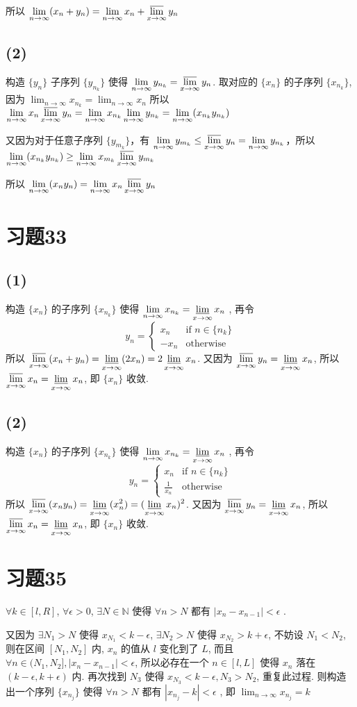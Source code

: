 \documentclass[a4paper,11pt]{article}
\newcommand{\Limit}{\displaystyle \lim_{n \rightarrow \infty}}
\newcommand{\uLimit}{\displaystyle \varlimsup_{x\rightarrow\infty}}
\newcommand{\dLimit}{\displaystyle \varliminf_{x\rightarrow\infty}}
\begin{document}
所以 $\Limit (x_n + y_n) = \Limit x_n + \uLimit y_n$
\subsection*{(2)}
构造 $\{y_n\}$ 子序列 $\{y_{n_k}\}$ 使得 $\Limit y_{n_k} = \uLimit y_n$. 取对应的 $\{x_n\}$ 的子序列 $\{x_{n_k}\}$, 因为 $\Limit x_{n_k} = \Limit x_n$ 所以$\Limit x_n\uLimit y_n = \Limit x_{n_k}\Limit y_{n_k} = \Limit (x_{n_k} y_{n_k})$

又因为对于任意子序列 $\{y_{m_k}\}$，有 $\Limit y_{m_k} \le \uLimit y_n = \Limit y_{n_k}$，所以 $\Limit (x_{n_k} y_{n_k}) \ge \Limit x_{m_k} \uLimit y_{m_k}$

所以 $\Limit (x_n y_n) = \Limit x_n \uLimit y_n$
\section*{习题33}
\subsection*{(1)}
构造 $\{x_n\}$ 的子序列 $\{x_{n_k}\}$ 使得 $\Limit x_{n_k} = \dLimit x_n$ , 再令$$y_n=
\begin{cases}
	x_n  & \textrm{if } n \in \{n_k\}\\
	-x_n  & \textrm{otherwise}
\end{cases}$$所以 $\uLimit (x_n + y_n) = \dLimit(2x_n) = 2\dLimit x_n$. 又因为 $\uLimit y_n = \dLimit x_n$, 所以 $\uLimit x_n = \dLimit x_n$, 即 $\{x_n\}$ 收敛. 
\subsection*{(2)}
构造 $\{x_n\}$ 的子序列 $\{x_{n_k}\}$ 使得 $\Limit x_{n_k} = \dLimit x_n$ , 再令$$y_n=
\begin{cases}
	x_n  & \textrm{if } n \in \{n_k\}\\
	\frac{1}{x_n}  & \textrm{otherwise}
\end{cases}$$所以 $\uLimit (x_n y_n) = \dLimit(x_n^2) = (\dLimit x_n)^2$. 又因为 $\uLimit y_n = \dLimit x_n$, 所以 $\uLimit x_n = \dLimit x_n$, 即 $\{x_n\}$ 收敛. 
\section*{习题35}
$\forall k \in [l, R]$, $\forall \epsilon > 0$, $\exists N \in \mathbb{N}$ 使得 $\forall n > N$ 都有 $|x_n - x_{n-1}| < \epsilon$ . 

又因为 $\exists N_1 > N$ 使得 $x_{N_1} < k - \epsilon$, $\exists N_2 > N$ 使得 $x_{N_2} > k + \epsilon$, 不妨设 $N_1 < N_2$, 则在区间 $[N_1, N_2]$ 内, $x_n$ 的值从 $l$ 变化到了 $L$, 而且$\forall n \in (N_1, N_2], |x_n - x_{n-1}| < \epsilon$, 所以必存在一个 $n \in [l, L]$ 使得 $x_n$ 落在 $(k - \epsilon, k + \epsilon)$ 内. 再次找到 $N_3$ 使得 $x_{N_3} < k - \epsilon, N_3 > N_2$, 重复此过程. 则构造出一个序列 $\{x_{n_j}\}$ 使得 $\forall n > N$ 都有 $|x_{n_j} - k| < \epsilon$ , 即 $\Limit x_{n_j} = k$
\end{document}
